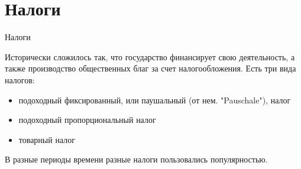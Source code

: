 \documentclass{beamer}
\begin{document}
%
%
%
%
%
%
%
%
%
%
\section{Налоги}

\begin{frame}{Налоги}

Исторически сложилось так, что государство финансирует свою деятельность, а также производство общественных благ за счет налогообложения. Есть три вида налогов:

\begin{itemize}
\item \alert{подоходный фиксированный}, или паушальный (от нем. "Pauschale"), налог
\item \alert{подоходный пропорциональный} налог
\item \alert{товарный} налог

\end{itemize}

В разные периоды времени разные налоги пользовались популярностью. 

\end{frame}
\end{document}
